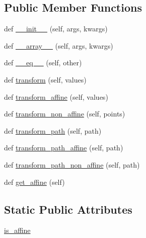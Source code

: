 \subsection*{Public Member Functions}
\begin{DoxyCompactItemize}
\item 
def \hyperlink{classmatplotlib_1_1transforms_1_1AffineBase_a7385eb35bcea8ca70976c5f4efafeebf}{\+\_\+\+\_\+init\+\_\+\+\_\+} (self, args, kwargs)
\item 
def \hyperlink{classmatplotlib_1_1transforms_1_1AffineBase_ad59d63d3257f0c6882096f8ba10a5b74}{\+\_\+\+\_\+array\+\_\+\+\_\+} (self, args, kwargs)
\item 
def \hyperlink{classmatplotlib_1_1transforms_1_1AffineBase_a1d6cae6b826dc9f07db3ab5c462e06dd}{\+\_\+\+\_\+eq\+\_\+\+\_\+} (self, other)
\item 
def \hyperlink{classmatplotlib_1_1transforms_1_1AffineBase_a610b1a5dbb9222a2a5f1f1f17fd342c2}{transform} (self, values)
\item 
def \hyperlink{classmatplotlib_1_1transforms_1_1AffineBase_a754ae516d829d14c593d570a0eb54089}{transform\+\_\+affine} (self, values)
\item 
def \hyperlink{classmatplotlib_1_1transforms_1_1AffineBase_aa2f4d563672355e16328b41a3348d039}{transform\+\_\+non\+\_\+affine} (self, points)
\item 
def \hyperlink{classmatplotlib_1_1transforms_1_1AffineBase_a506620a1a3004a762ffecca54034d801}{transform\+\_\+path} (self, path)
\item 
def \hyperlink{classmatplotlib_1_1transforms_1_1AffineBase_ad5118f519353ce87769b44ede33f9b42}{transform\+\_\+path\+\_\+affine} (self, path)
\item 
def \hyperlink{classmatplotlib_1_1transforms_1_1AffineBase_aae1754d92da60d03ed013cc618675b3e}{transform\+\_\+path\+\_\+non\+\_\+affine} (self, path)
\item 
def \hyperlink{classmatplotlib_1_1transforms_1_1AffineBase_a6f611974f26d6f4a6a646d2a41f94214}{get\+\_\+affine} (self)
\end{DoxyCompactItemize}
\subsection*{Static Public Attributes}
\begin{DoxyCompactItemize}
\item 
\hyperlink{classmatplotlib_1_1transforms_1_1AffineBase_a2ec5cf63d7c391ee8369aab1dc5a1d43}{is\+\_\+affine}
\end{DoxyCompactItemize}


